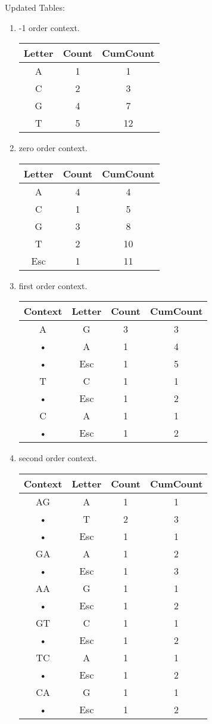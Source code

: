 \begin{solution}
Updated Tables:
\begin{enumerate}
\item -1 order context. \\
\begin{tabular}{|c|c|c|}
\hline 
Letter  & Count & CumCount \\ 
\hline 
A & 1 & 1 \\ 
\hline 
C & 2 & 3 \\ 
\hline 
G & 4 & 7 \\ 
\hline 
T & 5 & 12 \\ 
\hline 
\end{tabular} 
\item zero order context. \\
\begin{tabular}{|c|c|c|}
\hline 
Letter  & Count & CumCount \\ 
\hline 
A & 4 & 4 \\ 
\hline 
C & 1 & 5 \\ 
\hline 
G & 3 & 8 \\ 
\hline 
T & 2 & 10 \\ 
\hline 
Esc & 1 & 11 \\ 
\hline 
\end{tabular} 
\item first order context. \\
\begin{tabular}{|c|c|c|c|}
\hline 
Context & Letter & Count & CumCount \\ 
\hline 
A & G & 3 & 3 \\ 
\hline 
• & A & 1 & 4 \\ 
\hline 
• & Esc & 1 & 5 \\ 
\hline 
T & C & 1 & 1 \\ 
\hline 
• & Esc & 1 & 2 \\ 
\hline 
C & A & 1 & 1 \\ 
\hline 
• & Esc & 1 & 2 \\ 
\hline 
\end{tabular} 
\item second order context. \\
\begin{tabular}{|c|c|c|c|}
\hline 
Context & Letter & Count & CumCount \\ 
\hline 
AG & A & 1 & 1 \\ 
\hline 
• & T & 2 & 3 \\ 
\hline 
• & Esc & 1 & 1 \\ 
\hline 
GA & A & 1 & 2 \\ 
\hline 
• & Esc & 1 & 3 \\ 
\hline 
AA & G & 1 & 1 \\ 
\hline 
• & Esc & 1 & 2 \\ 
\hline 
GT & C & 1 & 1 \\ 
\hline 
• & Esc & 1 & 2 \\ 
\hline 
TC & A & 1 & 1 \\ 
\hline 
• & Esc & 1 & 2 \\ 
\hline 
CA & G & 1 & 1 \\ 
\hline 
• & Esc & 1 & 2 \\ 
\hline 
\end{tabular} 



\end{enumerate}
\end{solution}
